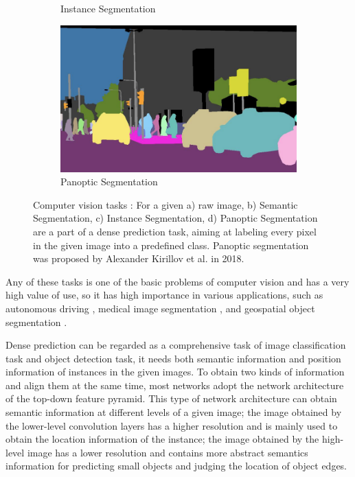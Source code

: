 \begin{figure}[htb]
\begin{subfigure}[t]{.45\linewidth}
        \caption{Instance Segmentation}\label{Instance Segmentation}
    \end{subfigure}
    \begin{subfigure}[t]{.45\linewidth}
        \centering
        \includegraphics[width=1\textwidth]{figures/PanopticSegmentation.png}
        \caption{Panoptic Segmentation}\label{Panoptic Segmentation}
    \end{subfigure}
    \caption{Computer vision tasks \cite{kirillov2019panoptic}: For a given a) raw image, b) Semantic Segmentation, c) Instance Segmentation, d) Panoptic Segmentation are a part of a dense prediction task, aiming at labeling every pixel in the given image into a predefined class. Panoptic segmentation was proposed by Alexander Kirillov et al. in 2018.}\label{Dense Prediction Tasks}
\end{figure}


Any of these tasks is one of the basic problems of computer vision and has a very high value of use, so it has high importance in various applications, such as autonomous driving \cite{de2017semantic}, medical image segmentation \cite{lei2020medical}, and geospatial object segmentation \cite{zheng2020foreground}.

Dense prediction can be regarded as a comprehensive task of image classification task and object detection task, it needs both semantic information and position information of instances in the given images. To obtain two kinds of information and align them at the same time, most networks adopt the network architecture of the top-down feature pyramid. This type of network architecture can obtain semantic information at different levels of a given image; the image obtained by the lower-level convolution layers has a higher resolution and is mainly used to obtain the location information of the instance; the image obtained by the high-level image has a lower resolution and contains more abstract semantics information for predicting small objects and judging the location of object edges.


